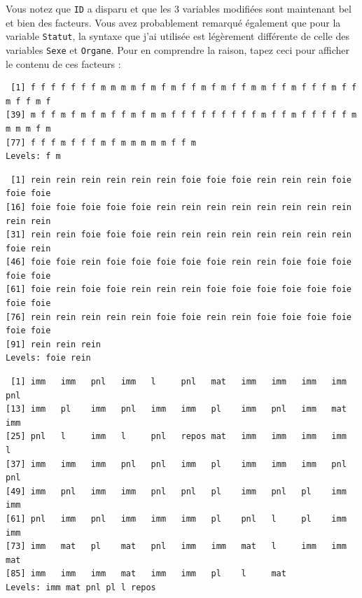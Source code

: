\documentclass[
  a4paper,
  DIV=11,
  numbers=noendperiod,
  oneside]{scrreprt}
\newenvironment{Shaded}{}{}
\newcommand{\NormalTok}[1]{\textcolor[rgb]{0.14,0.16,0.18}{#1}}
\newcommand{\SpecialCharTok}[1]{\textcolor[rgb]{0.00,0.36,0.77}{#1}}
\begin{document}
Vous notez que \texttt{ID} a disparu et que les 3 variables modifiées
sont maintenant bel et bien des facteurs. Vous avez probablement
remarqué également que pour la variable \texttt{Statut}, la syntaxe que
j'ai utilisée est légèrement différente de celle des variables
\texttt{Sexe} et \texttt{Organe}. Pour en comprendre la raison, tapez
ceci pour afficher le contenu de ces facteurs :

\begin{Shaded}
\end{Shaded}

\begin{verbatim}
 [1] f f f f f f f m m m m f m f m f f m f m f f m m f f m f f f m f f m f f m f
[39] m f f m f m f m f f m f m m f f f f f f f f f m f f m f f f f f m m m m f m
[77] f f f m f f f m f m m m m m f f m
Levels: f m
\end{verbatim}

\begin{Shaded}
\end{Shaded}

\begin{verbatim}
 [1] rein rein rein rein rein rein foie foie foie rein rein rein foie foie foie
[16] foie foie foie foie foie rein rein rein rein rein rein rein rein rein rein
[31] rein rein foie foie foie rein rein rein rein rein rein rein rein foie rein
[46] foie foie rein foie foie foie foie foie rein rein foie foie foie foie foie
[61] foie rein foie foie rein rein rein foie foie foie foie foie foie foie foie
[76] rein rein rein rein rein foie foie rein rein foie foie foie foie foie foie
[91] rein rein rein
Levels: foie rein
\end{verbatim}

\begin{Shaded}
\end{Shaded}

\begin{verbatim}
 [1] imm   imm   pnl   imm   l     pnl   mat   imm   imm   imm   imm   pnl  
[13] imm   pl    imm   pnl   imm   imm   pl    imm   pnl   imm   mat   imm  
[25] pnl   l     imm   l     pnl   repos mat   imm   imm   imm   imm   l    
[37] imm   imm   imm   pnl   pnl   imm   pl    imm   imm   imm   pnl   pnl  
[49] imm   pnl   imm   imm   pnl   pnl   pl    imm   pnl   pl    imm   imm  
[61] pnl   imm   pnl   imm   imm   imm   pl    pnl   l     pl    imm   imm  
[73] imm   mat   pl    mat   pnl   imm   imm   mat   l     imm   imm   mat  
[85] imm   imm   imm   mat   imm   imm   pl    l     mat  
Levels: imm mat pnl pl l repos
\end{verbatim}
\end{document}
